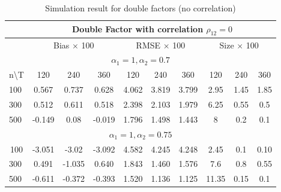 \begin{table}[!hbt]
		\caption{Simulation result for double factors (no correlation)}\label{table:exp2}
	\centering
	\begin{tabular}{lccccccccc}
		\hline
		\hline
\multicolumn{1}{l|}{}                   & \multicolumn{9}{c}{Double Factor with correlation $\rho_{12} = 0$}                                                                \\ \hline
\multicolumn{1}{l|}{}                   & \multicolumn{3}{c|}{Bias $\times$ 100}        & \multicolumn{3}{c|}{RMSE $\times$ 100}      & \multicolumn{3}{c}{Size $\times$ 100} \\ \hline
\multicolumn{10}{c}{$\alpha_1 = 1, \alpha_2  = 0.7$}                                                                                                                           \\ \hline
\multicolumn{1}{l|}{n\textbackslash{}T} & 120    & 240    & \multicolumn{1}{c|}{360}    & 120    & 240   & \multicolumn{1}{c|}{360}   & 120         & 240        & 360         \\ \hline
\multicolumn{1}{l|}{100}                & 0.567  & 0.737  & \multicolumn{1}{c|}{0.628}  & 4.062  & 3.819 & \multicolumn{1}{c|}{3.799} & 2.95        & 1.45       & 1.85        \\
\multicolumn{1}{l|}{300}                & 0.512  & 0.611  & \multicolumn{1}{c|}{0.518}  & 2.398  & 2.103 & \multicolumn{1}{c|}{1.979} & 6.25        & 0.55       & 0.5         \\
\multicolumn{1}{l|}{500}                & -0.149 & 0.08   & \multicolumn{1}{c|}{-0.019} & 1.796  & 1.498 & \multicolumn{1}{c|}{1.443} & 8           & 0.2        & 0.1         \\ \hline
\multicolumn{10}{c}{$\alpha_1 = 1, \alpha_2 =0.75$}                                                                                                                              \\ \hline
\multicolumn{1}{c|}{100}                & -3.051 & -3.02  & \multicolumn{1}{c|}{-3.092} & 4.582  & 4.245 & \multicolumn{1}{c|}{4.248} & 2.45        & 0.1        & 0.10        \\
\multicolumn{1}{l|}{300}                & 0.491  & -1.035 & \multicolumn{1}{c|}{0.640}  & 1.843  & 1.460 & \multicolumn{1}{c|}{1.576} & 7.6         & 0.8        & 0.55        \\
\multicolumn{1}{l|}{500}                & -0.611 & -0.372 & \multicolumn{1}{c|}{-0.393} & 1.520  & 1.136 & \multicolumn{1}{c|}{1.125} & 11.35       & 0.15       & 0.1         \\ \hline

\end{tabular}
\end{table}
